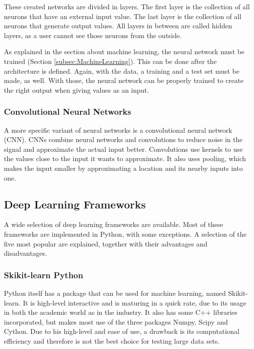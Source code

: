 \documentclass[10pt,a4paper]{report}
\begin{document}
	These created networks are divided in layers. The first layer is the 
	collection of all neurons that have an external input value. The last layer 
	is the collection of all neurons that generate output values. All layers in 
	between are called hidden layers, as a user cannot see those neurons from 
	the outside.\cite{Wang2003}
	
	As explained in the section about machine learning, the neural network must 
	be trained (Section \ref{subsec:MachineLearning}). This can be done after 
	the architecture is defined. Again, with the data, a training and a test 
	set must be made, as well. With those, the neural network can be properly 
	trained to create the right output when giving values as an input. 
	\cite{Wang2003}
	
	\subsubsection{Convolutional Neural Networks}
	
	A more specific variant of neural networks is a convolutional neural 
	network (CNN). CNNs combine neural networks and convolutions to reduce 
	noise in the signal and approximate the actual input better. Convolutions 
	use kernels to use the values close to the input it wants to approximate. 
	It also uses pooling, which makes the input smaller by approximating a 
	location and its nearby inputs into one. \cite{Goodfellow-et-al-2016}
	
	\clearpage
	
	\subsection{Deep Learning Frameworks}
	
	A wide selection of deep learning frameworks are available. Most of these 
	frameworks are implemented in Python, with some exceptions. A selection of 
	the five most popular are explained, together with their advantages and 
	disadvantages.
	
	\subsubsection{Skikit-learn Python}
	
	Python itself has a package that can be used for machine learning, named 
	Skikit-learn. It is high-level interactive and is maturing in a quick rate, 
	due to its usage in both the academic world as in the industry. It also has 
	some C++ libraries incorporated, but makes most use of the three packages 
	Numpy, Scipy and Cython. Due to his high-level and ease of use, a drawback 
	is its computational efficiency and therefore is not the best choice for 
	testing large data sets.\cite{pedregosa2011scikit}
	
\end{document}
